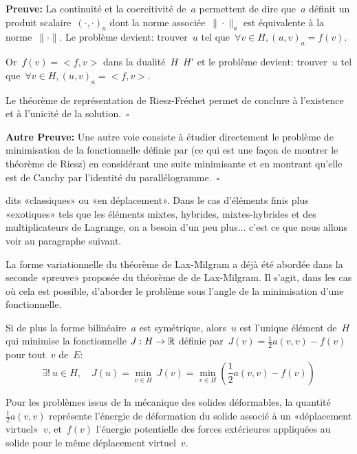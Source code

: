 \medskip
{\noindent\footnotesize{}
\textbf{Preuve:}\hskip5pt
La continuité et la coercitivité de~$a$ permettent de dire que~$a$ définit un produit scalaire~$(\cdot,\cdot)_a$ dont la norme associée~$\|\cdot\|_a$ est équivalente à la norme~$\|\cdot\|$. 
Le problème devient: trouver~$u$ tel que~$\forall v\in H, (u,v)_a=f(v)$.

Or~$f(v)=<f,v>$ dans la dualité~$H$~$H'$ et le problème devient:
trouver~$u$ tel que~$\forall v\in H, (u,v)_a=<f,v>$.

Le théorème de représentation de Riesz-Fréchet permet de conclure à l'existence et à l'unicité de la solution.~$\square$

\noindent
\textbf{Autre Preuve:}\hskip5pt Une autre voie consiste à étudier directement le problème de minimisation de la fonctionnelle définie par  (ce qui est une façon de montrer le théorème de Riesz) en considérant une suite minimisante et en montrant qu'elle est de Cauchy par l'identité du parallélogramme.~$\square$
}


\medskip
{} dits «classiques» ou «en déplacement». Dans le cas d'éléments finis plus «exotiques» tels que les éléments mixtes, hybrides, mixtes-hybrides et des multiplicateurs de Lagrange, on a besoin d'un peu plus... c'est ce que nous allons voir au paragraphe suivant.

\medskip
La forme variationnelle du théorème de Lax-Milgram a déjà été abordée dans la seconde «preuve» proposée du théorème de de Lax-Milgram. Il s'agit, dans les cas où cela est possible, d'aborder le problème sous l'angle de la minimisation d'une fonctionnelle.
\medskipvm
\begin{theoreme}
Si de plus la forme bilinéaire~$a$ est symétrique, alors~$u$ est l'unique élément de~$H$ qui minimise la fonctionnelle
$J: H\rightarrow\mathbb R$ définie par~$J(v) = \frac12 a(v,v)-f(v)$ pour tout~$v$ de~$E$:
\begin{equation}
\exists!\ u \in H,\quad J(u) = \min_{v\in H}\ J(v) = \min_{v\in H} \left( \frac12 a(v,v) - f(v) \right)
\end{equation}
\end{theoreme}

\medskip
{}
Pour les problèmes issus de la mécanique des solides déformables, la quantité~$\frac12 a(v,v)$ représente l'énergie de déformation du solide associé à un «déplacement virtuel»~$v$, et~$f(v)$ l'énergie potentielle des forces extérieures appliquées au solide pour le même déplacement virtuel~$v$.

